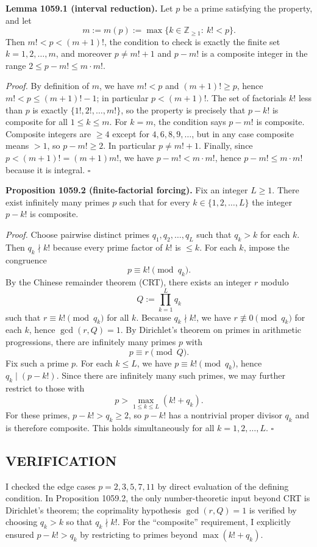 \medskip
\textbf{Lemma 1059.1 (interval reduction).}
Let $p$ be a prime satisfying the property, and let
\[
m:=m(p):=\max\{k\in\mathbb Z_{\ge 1}:\ k!<p\}.
\]
Then $m!<p<(m+1)!$, the condition to check is exactly the finite set $k=1,2,\dots,m$, and moreover $p\neq m!+1$ and $p-m!$ is a composite integer in the range $2\le p-m!\le m\cdot m!$.

\emph{Proof.}
By definition of $m$, we have $m!<p$ and $(m+1)!\ge p$, hence $m!<p\le (m+1)!-1$; in particular $p<(m+1)!$.
The set of factorials $k!$ less than $p$ is exactly $\{1!,2!,\dots,m!\}$, so the property is precisely that $p-k!$ is composite for all $1\le k\le m$.
For $k=m$, the condition says $p-m!$ is composite. Composite integers are $\ge 4$ except for $4,6,8,9,\dots$, but in any case composite means $>1$, so $p-m!\ge 2$. In particular $p\neq m!+1$.
Finally, since $p<(m+1)!=(m+1)m!$, we have $p-m!<m\cdot m!$, hence $p-m!\le m\cdot m!$ because it is integral. \hfill$\square$

\medskip
\textbf{Proposition 1059.2 (finite-factorial forcing).}
Fix an integer $L\ge 1$. There exist infinitely many primes $p$ such that for every $k\in\{1,2,\dots,L\}$ the integer $p-k!$ is composite.

\emph{Proof.}
Choose pairwise distinct primes $q_1,q_2,\dots,q_L$ such that $q_k>k$ for each $k$. Then $q_k\nmid k!$ because every prime factor of $k!$ is $\le k$.
For each $k$, impose the congruence
\[
p\equiv k!\pmod{q_k}.
\]
By the Chinese remainder theorem (CRT), there exists an integer $r$ modulo
\[
Q:=\prod_{k=1}^L q_k
\]
such that $r\equiv k!\pmod{q_k}$ for all $k$.
Because $q_k\nmid k!$, we have $r\not\equiv 0\pmod{q_k}$ for each $k$, hence $\gcd(r,Q)=1$.
By Dirichlet's theorem on primes in arithmetic progressions, there are infinitely many primes $p$ with
\[
p\equiv r\pmod{Q}.
\]
Fix such a prime $p$. For each $k\le L$, we have $p\equiv k!\pmod{q_k}$, hence $q_k\mid (p-k!)$.
Since there are infinitely many such primes, we may further restrict to those with
\[
p>\max_{1\le k\le L}(k!+q_k).
\]
For these primes, $p-k!>q_k\ge 2$, so $p-k!$ has a nontrivial proper divisor $q_k$ and is therefore composite.
This holds simultaneously for all $k=1,2,\dots,L$. \hfill$\square$

\subsection*{VERIFICATION}
I checked the edge cases $p=2,3,5,7,11$ by direct evaluation of the defining condition. In Proposition 1059.2, the only number-theoretic input beyond CRT is Dirichlet's theorem; the coprimality hypothesis $\gcd(r,Q)=1$ is verified by choosing $q_k>k$ so that $q_k\nmid k!$.
For the ``composite'' requirement, I explicitly ensured $p-k!>q_k$ by restricting to primes beyond $\max(k!+q_k)$.

